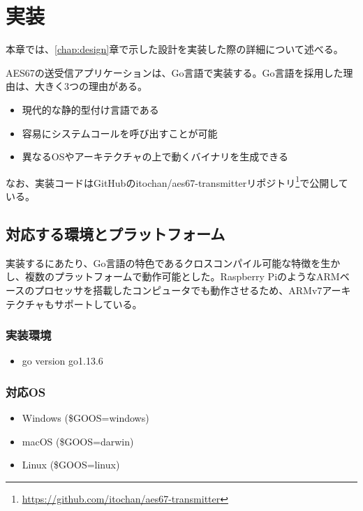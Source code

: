 \chapter{実装}
\label{chap:implementation}

本章では、\ref{chap:design}章で示した設計を実装した際の詳細について述べる。

AES67の送受信アプリケーションは、Go言語で実装する。Go言語を採用した理由は、大きく3つの理由がある。

\begin{itemize}
  \item 現代的な静的型付け言語である
  \item 容易にシステムコールを呼び出すことが可能
  \item 異なるOSやアーキテクチャの上で動くバイナリを生成できる
\end{itemize}

なお、実装コードはGitHubのitochan/aes67-transmitterリポジトリ\footnote{\url{https://github.com/itochan/aes67-transmitter}}で公開している。

\section{対応する環境とプラットフォーム}

実装するにあたり、Go言語の特色であるクロスコンパイル可能な特徴を生かし、複数のプラットフォームで動作可能とした。Raspberry PiのようなARMベースのプロセッサを搭載したコンピュータでも動作させるため、ARMv7アーキテクチャもサポートしている。

\subsection{実装環境}

\begin{itemize}
  \item{go version go1.13.6}
\end{itemize}

\subsection{対応OS}

\begin{itemize}
  \item Windows (\$GOOS=windows)
  \item macOS (\$GOOS=darwin)
  \item Linux (\$GOOS=linux)
\end{itemize}

